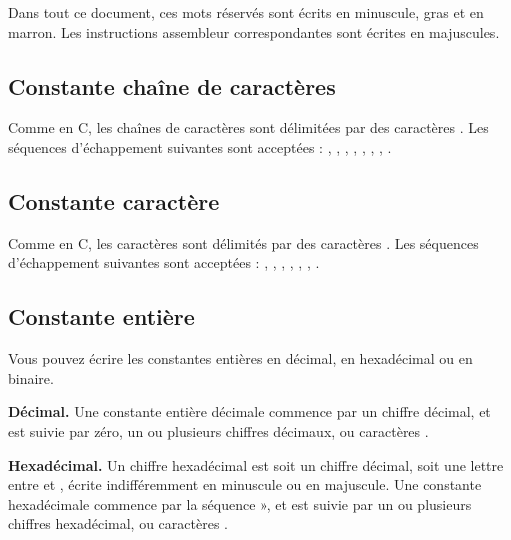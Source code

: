 Dans tout ce document, ces mots réservés sont écrits en minuscule, gras et en marron. Les instructions assembleur correspondantes sont écrites en majuscules.


\subsection{Constante chaîne de caractères}

Comme en C, les chaînes de caractères sont délimitées par des caractères . Les séquences d’échappement suivantes sont acceptées : \piccolo{\\f}, \piccolo{\\n}, \piccolo{\\r}, \piccolo{\\v}, \piccolo{\\\\}, , , .

\subsection{Constante caractère}

Comme en C, les caractères sont délimités par des caractères .  Les séquences d’échappement suivantes sont acceptées : \piccolo{\\f}, \piccolo{\\n}, \piccolo{\\r}, \piccolo{\\v}, \piccolo{\\\\}, , .

\subsection{Constante entière}

Vous pouvez écrire les constantes entières en décimal, en hexadécimal ou en binaire. 

\textbf{Décimal.} Une constante entière décimale commence par un chiffre décimal, et est suivie par zéro, un ou plusieurs chiffres décimaux, ou caractères \piccolo{\_}.

\textbf{Hexadécimal.} Un chiffre hexadécimal est soit un chiffre décimal, soit une lettre entre  et , écrite indifféremment en minuscule ou en majuscule. Une constante hexadécimale commence par la séquence  », et est suivie par un ou plusieurs chiffres hexadécimal, ou caractères \piccolo{\_}.

